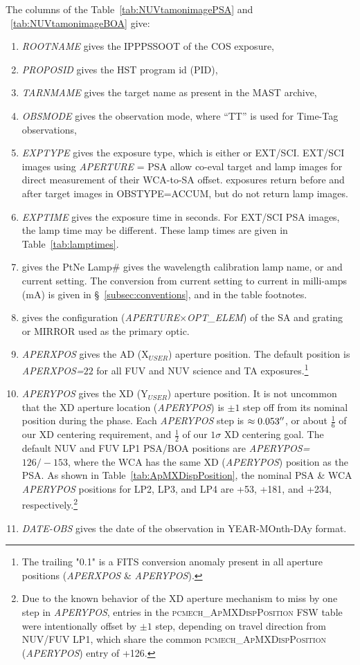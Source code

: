 The columns of the Table~\ref{tab:NUVtamonimagePSA} and ~\ref{tab:NUVtamonimageBOA} give:
\footnotesize
\begin{enumerate}
\item \textit{ROOTNAME} gives the IPPPSSOOT of the COS exposure,
\item \textit{PROPOSID} gives the HST program id (PID),
\item \textit{TARNMAME} gives the target name as present in the MAST archive,
\item \textit{OBSMODE} gives the observation mode, where ``TT'' is used for Time-Tag observations,
\item \textit{EXPTYPE} gives the exposure type, which is either  or EXT/SCI. EXT/SCI images using \textit{APERTURE} = PSA allow co-eval target and lamp images for
direct measurement of their WCA-to-SA offset.  exposures return before and after target images in \textsc{OBSTYPE}=ACCUM, but do not return lamp images.
\item \textit{EXPTIME} gives the exposure time in seconds. For EXT/SCI PSA images, the lamp time may be different. These lamp times are given in Table~\ref{tab:lamptimes}.
\item gives the PtNe Lamp\# gives the wavelength calibration lamp name, \plampone or \plamptwo and current setting. The conversion from current setting to current in milli-amps (mA) is given in \S~\ref{subsec:conventions}, and in the table footnotes.
\item gives the configuration (\textit{APERTURE}$\times$\textit{OPT\_ELEM}) of the SA and grating or MIRROR used as the primary optic.
\item \textit{APERXPOS} gives the AD (X$_{USER}$) aperture position. The default position is \textit{APERXPOS=$22$} for all FUV and NUV science and TA exposures.\footnote{The trailing "0.1" is a FITS conversion anomaly present in all aperture positions (\textit{APERXPOS} \& \textit{APERYPOS}).}
\item \textit{APERYPOS} gives the XD (Y$_{USER}$) aperture position. It is not uncommon that the XD aperture location (\textit{APERYPOS}) is $\pm 1$ step off from its nominal position during the  phase. Each \textit{APERYPOS} step is $\approx0.053\hbox{$^{\prime\prime}$}$, or about $\frac{1}{6}$ of
our XD centering requirement, and $\frac{1}{2}$ of our $1\sigma$ XD centering goal. The default NUV and FUV LP1 PSA/BOA positions are \textit{APERYPOS=$126/-153$}, where the WCA has the same XD (\textit{APERYPOS}) position as the PSA.
As shown in Table~\ref{tab:ApMXDispPosition}, the nominal PSA \& WCA \textit{APERYPOS} positions for LP2, LP3, and LP4 are +53, +181, and +234, respectively.\footnote{Due
to the known behavior of the XD aperture mechanism to miss by one step in \textit{APERYPOS}, entries in the \textsc{pcmech\_ApMXDispPosition} FSW table were intentionally offset by $\pm 1$ step, depending on travel direction from NUV/FUV LP1, which
share the common \textsc{pcmech\_ApMXDispPosition} (\textit{APERYPOS}) entry of +126.}
\item \textit{DATE-OBS} gives the date of the observation in YEAR-MOnth-DAy format.
\end{enumerate}
\normalsize

